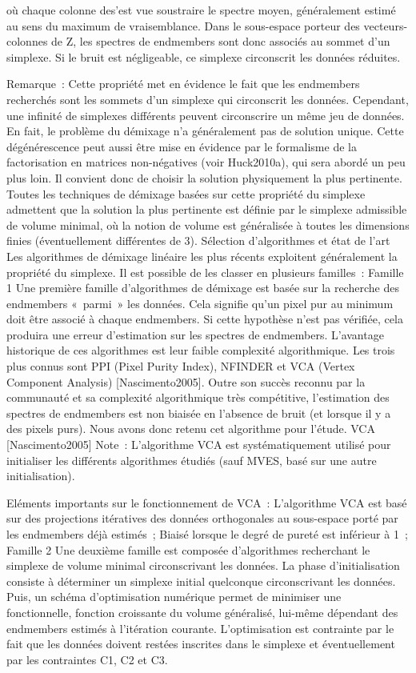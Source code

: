 où chaque colonne des’est vue soustraire le spectre moyen, généralement estimé au sens du maximum de vraisemblance. Dans le sous-espace porteur des vecteurs-colonnes de Z, les spectres de endmembers sont donc associés au sommet d’un simplexe. Si le bruit est négligeable, ce simplexe circonscrit les données réduites.

Remarque :
Cette propriété met en évidence le fait que les endmembers recherchés sont les sommets d’un simplexe qui circonscrit les données. Cependant, une infinité de simplexes différents peuvent circonscrire un même jeu de données. En fait, le problème du démixage n’a généralement pas de solution unique. Cette dégénérescence peut aussi être mise en évidence par le formalisme de la factorisation en matrices non-négatives (voir Huck2010a), qui sera abordé un peu plus loin. Il convient donc de choisir la solution physiquement la plus pertinente. Toutes les techniques de démixage basées sur cette propriété du simplexe admettent que la solution la plus pertinente est définie par le simplexe admissible de volume minimal, où la notion de volume est généralisée à toutes les dimensions finies (éventuellement différentes de 3). 
Sélection d’algorithmes et état de l’art
Les algorithmes de démixage linéaire les plus récents exploitent généralement la propriété du simplexe. Il est possible de les classer en plusieurs familles :
Famille 1
Une première famille d’algorithmes de démixage est basée sur la recherche des endmembers « parmi » les données. Cela signifie qu’un pixel pur au minimum doit être associé à chaque endmembers. Si cette hypothèse n’est pas vérifiée, cela produira une erreur d’estimation sur les spectres de endmembers. L’avantage historique de ces algorithmes est leur faible complexité algorithmique. Les trois plus connus sont PPI (Pixel Purity Index), NFINDER et VCA (Vertex Component Analysis) [Nascimento2005]. Outre son succès reconnu par la communauté et sa complexité algorithmique très compétitive, l’estimation des spectres de endmembers est non biaisée en l’absence de bruit (et lorsque il y a des pixels purs). Nous avons donc retenu cet algorithme pour l’étude.
VCA [Nascimento2005]
Note : L’algorithme VCA est systématiquement utilisé pour initialiser les différents algorithmes étudiés (sauf MVES, basé sur une autre initialisation).

Eléments importants sur le fonctionnement de VCA :
L’algorithme VCA est basé sur des projections itératives des données orthogonales au sous-espace porté par les endmembers déjà estimés ;
Biaisé lorsque le degré de pureté est inférieur à 1 ;
Famille 2
Une deuxième famille est composée d’algorithmes recherchant le simplexe de volume minimal circonscrivant les données. La phase d’initialisation consiste à déterminer un simplexe initial quelconque circonscrivant les données. Puis, un schéma d’optimisation numérique permet de minimiser une fonctionnelle, fonction croissante du volume généralisé, lui-même dépendant des endmembers estimés à l’itération courante. L’optimisation est contrainte par le fait que les données doivent restées inscrites dans le simplexe et éventuellement par les contraintes C1, C2 et C3.

